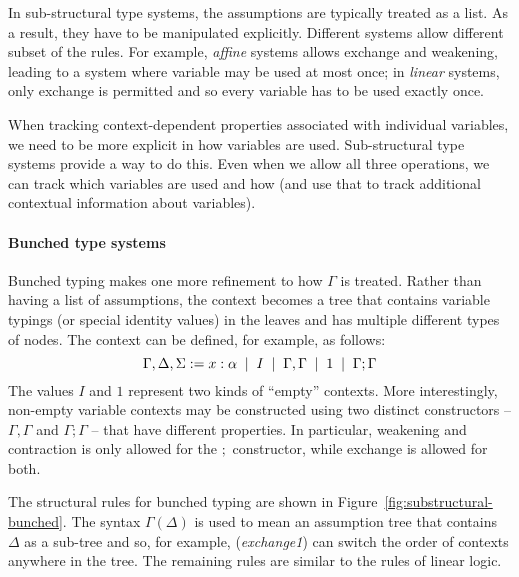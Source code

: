 In sub-structural type systems, the assumptions are typically treated as a list. As a result,
they have to be manipulated explicitly. Different systems allow different subset of the rules.
For example, \emph{affine} systems allows exchange and weakening, leading to a system where 
variable may be used at most once; in \emph{linear} systems, only exchange is permitted and so 
every variable has to be used exactly once.

When tracking context-dependent properties associated with individual variables, we need to 
be more explicit in how variables are used. Sub-structural type systems provide a way to do this.
Even when we allow all three operations, we can track which variables are used and how
(and use that to track additional contextual information about variables). 


\paragraph{Bunched type systems}
Bunched typing makes one more refinement to how $\Gamma$ is treated. Rather than having a list
of assumptions, the context becomes a tree that contains variable typings (or special identity
values) in the leaves and has multiple different types of nodes. The context can be defined,
for example, as follows:
%
\begin{equation*}
\Gamma, \Delta, \Sigma := x:\alpha \;\; | \;\; I \;\; | \;\; \Gamma, \Gamma \;\; | \;\; 1 \;\; | \;\; \Gamma; \Gamma
\end{equation*}
%
The values $I$ and $1$ represent two kinds of ``empty'' contexts. More interestingly, non-empty
variable contexts may be constructed using two distinct constructors -- $\Gamma, \Gamma$ and 
$\Gamma; \Gamma$ -- that have different properties. In particular, weakening and contraction is
only allowed for the $;$ constructor, while exchange is allowed for both.  

The structural rules for bunched typing are shown in Figure~\ref{fig:substructural-bunched}.
The syntax $\Gamma(\Delta)$ is used to mean an assumption tree that contains $\Delta$ as a 
sub-tree and so, for example, (\emph{exchange1}) can switch the order of contexts anywhere in the
tree. The remaining rules are similar to the rules of linear logic.

